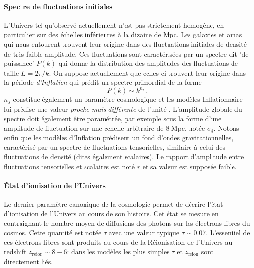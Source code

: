\paragraph{Spectre de fluctuations initiales} L'Univers tel qu'observé actuellement n'est pas strictement homogène, en particulier sur des échelles inférieures à la dizaine de Mpc. Les galaxies et amas qui nous entourent trouvent leur origine dans des fluctuations initiales de densité de très faible amplitude. Ces fluctuations sont caractérisées par un spectre dit 'de puissance'  $P(k)$ qui donne la distribution des amplitudes des fluctuations de taille $L=2\pi/k$. On suppose actuellement que celles-ci trouvent leur origine dans la période \textit{d'Inflation} qui prédit un spectre primordial de la forme  
\begin{equation}
P(k)\sim  k^{n_s}.
\end{equation} 
$n_s$ constitue également un paramètre cosmologique et les modèles Inflationnaire lui prédise une valeur \textit{proche mais différente} de l'unité . L'amplitude globale du spectre doit également être paramétrée, par exemple sous la forme d'une amplitude de fluctuation sur une échelle arbitraire de 8 Mpc, notée $\sigma_8$. Notons enfin que les modèles d'Inflation prédisent un fond d'ondes gravitationnelles, caractérisé par un spectre de fluctuations tensorielles, similaire à celui des fluctuations de densité (dites également scalaires). Le rapport d'amplitude entre fluctuations tensorielles et scalaires est noté $r$ et sa valeur est supposée faible.

\paragraph{État d'ionisation de l'Univers} Le dernier paramètre canonique de la cosmologie permet de décrire l'état d'ionisation  de l'Univers au cours de son histoire. Cet état se mesure en  contraignant le nombre moyen de diffusions des photons sur les électrons libres du cosmos. Cette quantité est notée $\tau$ avec une valeur typique $\tau \sim 0.07$. L'essentiel de ces électrons libres sont produits au cours de la Réionisation  de l'Univers au redshift $z_\mathrm{reion}\sim 8-6$: dans les modèles les plus simples $\tau$ et $z_\mathrm{reion}$ sont directement liés.

